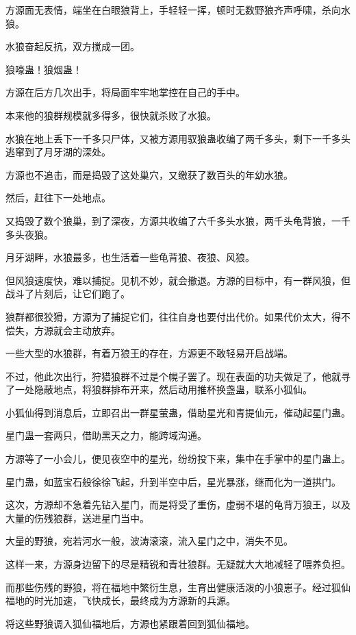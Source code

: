 \begin{this_body}
方源面无表情，端坐在白眼狼背上，手轻轻一挥，顿时无数野狼齐声呼啸，杀向水狼。

水狼奋起反抗，双方搅成一团。

狼嚎蛊！狼烟蛊！

方源在后方几次出手，将局面牢牢地掌控在自己的手中。

本来他的狼群规模就多得多，很快就杀败了水狼。

水狼在地上丢下一千多只尸体，又被方源用驭狼蛊收编了两千多头，剩下一千多头逃窜到了月牙湖的深处。

方源也不追击，而是捣毁了这处巢穴，又缴获了数百头的年幼水狼。

然后，赶往下一处地点。

又捣毁了数个狼巢，到了深夜，方源共收编了六千多头水狼，两千头龟背狼，一千多头夜狼。

月牙湖畔，水狼最多，也生活着一些龟背狼、夜狼、风狼。

但风狼速度快，难以捕捉。见机不妙，就会撤退。方源的目标中，有一群风狼，但战斗了片刻后，让它们跑了。

狼群都很狡猾，方源为了捕捉它们，往往自身也要付出代价。如果代价太大，得不偿失，方源就会主动放弃。

一些大型的水狼群，有着万狼王的存在，方源更不敢轻易开启战端。

不过，他此次出行，狩猎狼群不过是个幌子罢了。现在表面的功夫做足了，他就寻了一处隐蔽地点，将狼群排布开来，然后动用推杯换盏蛊，联系小狐仙。

小狐仙得到消息后，立即召出一群星萤蛊，借助星光和青提仙元，催动起星门蛊。

星门蛊一套两只，借助黑天之力，能跨域沟通。

方源等了一小会儿，便见夜空中的星光，纷纷投下来，集中在手掌中的星门蛊上。

星门蛊，如蓝宝石般徐徐飞起，升到半空中后，星光暴涨，继而化为一道拱门。

这次，方源却不急着先钻入星门，而是将受了重伤，虚弱不堪的龟背万狼王，以及大量的伤残狼群，送进星门当中。

大量的野狼，宛若河水一般，波涛滚滚，流入星门之中，消失不见。

这样一来，方源身边留下的尽是精锐和青壮狼群。无疑就大大地减轻了喂养负担。

而那些伤残的野狼，将在福地中繁衍生息，生育出健康活泼的小狼崽子。经过狐仙福地的时光加速，飞快成长，最终成为方源新的兵源。

将这些野狼调入狐仙福地后，方源也紧跟着回到狐仙福地。


\end{this_body}
